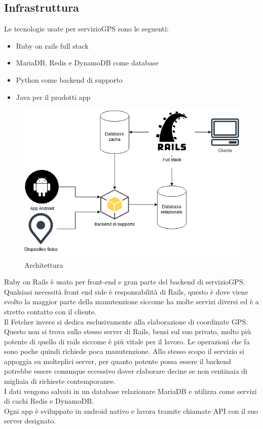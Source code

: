 \documentclass[12pt]{article}
\begin{document}
\subsection{Infrastruttura}
Le tecnologie usate per servizioGPS sono le seguenti:
\begin{itemize}
  \item Ruby on rails full stack
  \item MariaDB, Redis  e DynamoDB come database
  \item Python come backend di supporto
  \item Java per il prodotti app 
\end{itemize}
\begin{figure}[H]
\includegraphics[scale = 0.6]{infrastructure.png}
\caption{Architettura}
\end{figure}
Ruby on Rails è usato per front-end e gran parte del backend di servizioGPS. 
Qualsiasi necessità front end side è responsabilità di Rails, questo è dove 
viene svolto la maggior parte della manutenzione siccome ha molte servizi diversi 
ed è a stretto contatto con il cliente.
\\ Il Fetcher invece si dedica esclusivamente alla elaborazione di coordinate GPS. 
Questo non si trova sullo stesso server di Rails, bensi sul suo privato, molto 
più potente di quello di rails siccome è più vitale per il lavoro.
Le operazioni che fa sono poche quindi richiede poca manutenzione. 
Allo stesso scopo il servizio si appoggia su molteplici server, per quanto 
potente possa essere il backend potrebbe essere comunque eccessivo dover 
elaborare decine se non centinaia di migliaia di richieste contemporanee.
\\ I dati vengono salvati in un database relazionare MariaDB e utilizza come 
servizi di cachi Redis e DynamoDB. 
\\ Ogni app è sviluppato in android nativo e lavora tramite chiamate API 
con il suo server designato. 
\end{document}
